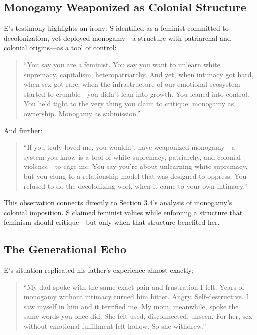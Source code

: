 \documentclass[12pt,openany]{book}
\numberwithin{equation}{chapter}
\begin{document}
\subsection{Monogamy Weaponized as Colonial Structure}

E's testimony highlights an irony: S identified as a feminist committed to decolonization, yet deployed monogamy---a structure with patriarchal and colonial origins---as a tool of control:

\begin{quote}
``You say you are a feminist. You say you want to unlearn white supremacy, capitalism, heteropatriarchy. And yet, when intimacy got hard, when sex got rare, when the infrastructure of our emotional ecosystem started to crumble---you didn't lean into growth. You leaned into control. You held tight to the very thing you claim to critique: monogamy as ownership. Monogamy as submission.''
\end{quote}

And further:

\begin{quote}
``If you truly loved me, you wouldn't have weaponized monogamy---a system you know is a tool of white supremacy, patriarchy, and colonial violence---to cage me. You say you're about unlearning white supremacy, but you clung to a relationship model that was designed to oppress. You refused to do the decolonizing work when it came to your own intimacy.''
\end{quote}

This observation connects directly to Section 3.4's analysis of monogamy's colonial imposition. S claimed feminist values while enforcing a structure that feminism should critique---but only when that structure benefited her.

\subsection{The Generational Echo}

E's situation replicated his father's experience almost exactly:

\begin{quote}
``My dad spoke with the same exact pain and frustration I felt. Years of monogamy without intimacy turned him bitter. Angry. Self-destructive. I saw myself in him and it terrified me. My mom, meanwhile, spoke the same words you once did. She felt used, disconnected, unseen. For her, sex without emotional fulfillment felt hollow. So she withdrew.''
\end{quote}
\end{document}

